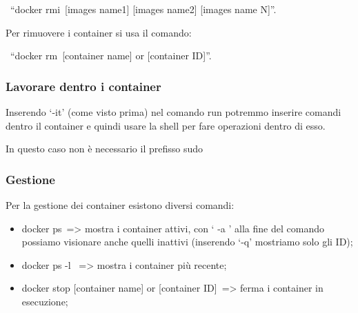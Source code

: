 \documentclass[
]{article}
\providecommand{\tightlist}{%
  \setlength{\itemsep}{0pt}\setlength{\parskip}{0pt}}
\begin{document}
{~``}{docker }{rmi}{~{[}images name1{]} {[}images name2{]} {[}images
name N{]}}{''.}

{}

{Per rimuovere i container si usa il comando:}

{~``}{docker }{rm}{~{[}container name{]} or {[}container ID{]}}{''.}

{}

\subsubsection{\texorpdfstring{{Lavorare dentro i
container}}{Lavorare dentro i container}}\label{h.lxt1x6tzd8bo}

{Inserendo `}{-it}{' (come visto prima) nel comando run potremmo
inserire comandi dentro il container e quindi usare la shell per fare
operazioni dentro di esso.}

{In questo caso non è necessario il prefisso sudo}

{}

\subsubsection{\texorpdfstring{{Gestione}}{Gestione}}\label{h.koc6458ioaot}

{Per la gestione dei container esistono diversi comandi:}

{}

\begin{itemize}
\tightlist
\item
  {docker ps}{~=\textgreater{} mostra i container attivi, con ` }{-a }{'
  alla fine del comando possiamo visionare anche quelli inattivi
  (inserendo `}{-q}{' mostriamo solo gli ID);}
\end{itemize}

{}

\begin{itemize}
\tightlist
\item
  {docker ps -l }{~=\textgreater{} mostra i container più recente;}
\end{itemize}

{}

\begin{itemize}
\tightlist
\item
  {docker stop {[}container name{]} or {[}container
  ID{]}}{~=\textgreater{} ferma i container in esecuzione;}
\end{itemize}

{}
\end{document}
